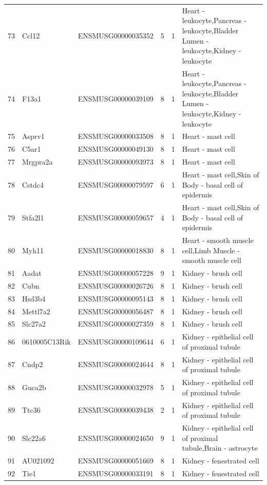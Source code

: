 \begin{table}[ht]
{\begin{tabular}{lllrrl}
        73 & Ccl12 & ENSMUSG00000035352 & 5 & 1 & Heart - leukocyte,Pancreas - leukocyte,Bladder Lumen - leukocyte,Kidney - leukocyte \\
        74 & F13a1 & ENSMUSG00000039109 & 8 & 1 & Heart - leukocyte,Pancreas - leukocyte,Bladder Lumen - leukocyte,Kidney - leukocyte \\
        75 & Asprv1 & ENSMUSG00000033508 & 8 & 1 & Heart - mast cell \\
        76 & C5ar1 & ENSMUSG00000049130 & 8 & 1 & Heart - mast cell \\
        77 & Mrgpra2a & ENSMUSG00000093973 & 8 & 1 & Heart - mast cell \\
        78 & Cstdc4 & ENSMUSG00000079597 & 6 & 1 & Heart - mast cell,Skin of Body - basal cell of epidermis \\
        79 & Stfa2l1 & ENSMUSG00000059657 & 4 & 1 & Heart - mast cell,Skin of Body - basal cell of epidermis \\
        80 & Myh11 & ENSMUSG00000018830 & 8 & 1 & Heart - smooth muscle cell,Limb Muscle - smooth muscle cell \\
        81 & Aadat & ENSMUSG00000057228 & 9 & 1 & Kidney - brush cell \\
        82 & Cubn & ENSMUSG00000026726 & 8 & 1 & Kidney - brush cell \\
        83 & Hsd3b4 & ENSMUSG00000095143 & 8 & 1 & Kidney - brush cell \\
        84 & Mettl7a2 & ENSMUSG00000056487 & 8 & 1 & Kidney - brush cell \\
        85 & Slc27a2 & ENSMUSG00000027359 & 8 & 1 & Kidney - brush cell \\
        86 & 0610005C13Rik & ENSMUSG00000109644 & 6 & 1 & Kidney - epithelial cell of proximal tubule \\
        87 & Cndp2 & ENSMUSG00000024644 & 8 & 1 & Kidney - epithelial cell of proximal tubule \\
        88 & Guca2b & ENSMUSG00000032978 & 5 & 1 & Kidney - epithelial cell of proximal tubule \\
        89 & Ttc36 & ENSMUSG00000039438 & 2 & 1 & Kidney - epithelial cell of proximal tubule \\
        90 & Slc22a6 & ENSMUSG00000024650 & 9 & 1 & Kidney - epithelial cell of proximal tubule,Brain - astrocyte \\
        91 & AU021092 & ENSMUSG00000051669 & 8 & 1 & Kidney - fenestrated cell \\
        92 & Tie1 & ENSMUSG00000033191 & 8 & 1 & Kidney - fenestrated cell \\

\end{tabular}}
\end{table}
